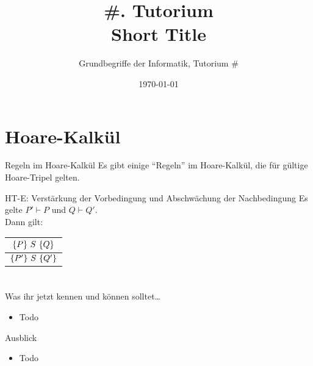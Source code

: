 




\title[Short Title]{\#. Tutorium\\ Short Title}
\subtitle{Grundbegriffe der Informatik, Tutorium \#\mytutnumber}
\date{\today}


\titleframe
\roadmap

\section{Hoare-Kalkül}
\begin{frame}{Regeln im Hoare-Kalkül}
	Es gibt einige ``Regeln'' im Hoare-Kalkül, die für gültige Hoare-Tripel gelten.

	\begin{block}{HT-E: Verstärkung der Vorbedingung und Abschwächung der Nachbedingung}
		Es gelte $P' \vdash P$ und $Q\vdash Q'$.\\[18pt]
		Dann gilt: \begin{tabular}{c}
						$\left\{ P \right\} \, S \, \left\{ Q \right\}$\\
						\midrule
						$\left\{ P' \right\} \, S \, \left\{ Q' \right\}$
					\end{tabular}
	\end{block}

\end{frame}
\section{}
	\begin{frame}{Was ihr jetzt kennen und können solltet\dots}
			\begin{itemize}
				\item Todo
			\end{itemize}
	
	\end{frame}
	\begin{frame}{Ausblick}
		\begin{itemize}
			\item Todo
		\end{itemize}
	\end{frame}
\section{}
\questionframe
\lastframe
{}
